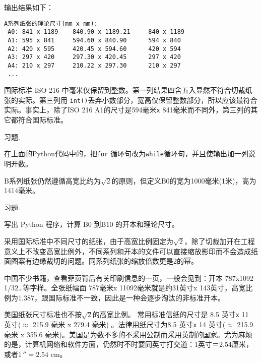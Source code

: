 \documentclass[main.tex]{subfiles}
\begin{document}
输出结果如下：
\vspace{.4cm}
\begin{spacing}{0.8}
	\begin{small}
\begin{lstlisting}
A系列纸张的理论尺寸(mm x mm):
 A0: 841 x 1189    840.90 x 1189.21     840 x 1189
 A1: 595 x 841     594.60 x 840.90      594 x 840
 A2: 420 x 595     420.45 x 594.60      420 x 594
 A3: 297 x 420     297.30 x 420.45      297 x 420
 A4: 210 x 297     210.22 x 297.30      210 x 297
 ...

\end{lstlisting}
\end{small}
\end{spacing}
\vspace{.4cm}\label{a_paper_py}
国际标准 ISO 216 中毫米仅保留到整数。第一列结果四舍五入显然不符合切裁纸张的实际。第三列用 \texttt{int()}丢弃小数部分，宽高仅保留整数部分，所以应该最符合实际。事实上，除了ISO 216 A1的尺寸是594毫米\texttt{x}{ }841毫米而不同外，第三列的其它都符合国际标准。

\begin{kaishu}习题.\end{kaishu} 在上面的Python代码中的，把\texttt{for} 循环句改为\texttt{while}循环句，并且使输出加一列说明开数。

B系列纸张仍然遵循高宽比约为$\sqrt{2}$的原则，但定义B0的宽为1000毫米(1米)，高为1414毫米。

\begin{kaishu}习题.\end{kaishu} 写出 Python 程序，计算 B0 到B10 的开本和理论尺寸。 

采用国际标准中不同尺寸的纸张，由于高宽比例固定为$\sqrt{2}$，除了切裁加开在工程意义上不改变高宽比例外，不同系列和开本的文件可以直接缩放影印而不会造成纸面图案有边缘裁切的问题。同系列纸张的缩放倍数更是2的幂。

中国不少书籍，查看菲页背后有关印刷信息的一页，一般会见到：开本 787x1092 1/32…等字样。全张纸幅面 787毫米x{ }11092毫米就是约31英寸x{ }143英寸，高宽比例为1.387，跟国际标准不一致，因此是一种会逐步淘汰的非标准开本。

美国纸张尺寸标准也不按$\sqrt{2}$的高宽比例。 常用标准信纸的尺寸是 8.5 英寸\texttt{x}{ }11 英寸($\approx$ 215.9 毫米 x 279.4 毫米) 。法律用纸尺寸为8.5 英寸\texttt{x}{ }14 英寸($\approx$ 215.9 毫米 x 355.6 毫米)。美国是为数不多的不采用公制而采用英制的国家。尤为麻烦的是，计算机网络和软件方面，仍然时不时要同英寸打交道：1英寸＝2.54厘米，或者$1\,'' = 2.54$ cm。
\newpage
\end{document}
